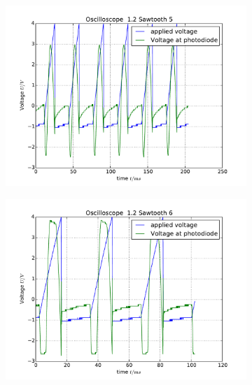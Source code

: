 \flushleft
\begin{figure}
    \begin{subfigure}[b]{\picwidth}
        \includegraphics[width=\textwidth]{analysis/figures/12sawtooth5}
        \caption{}
    \end{subfigure}\qquad
    \begin{subfigure}[b]{\picwidth}
        \includegraphics[width=\textwidth]{analysis/figures/12sawtooth6}
        \caption{}
    \end{subfigure}
    \begin{subfigure}[b]{\picwidth}

\end{subfigure}
\end{figure}
